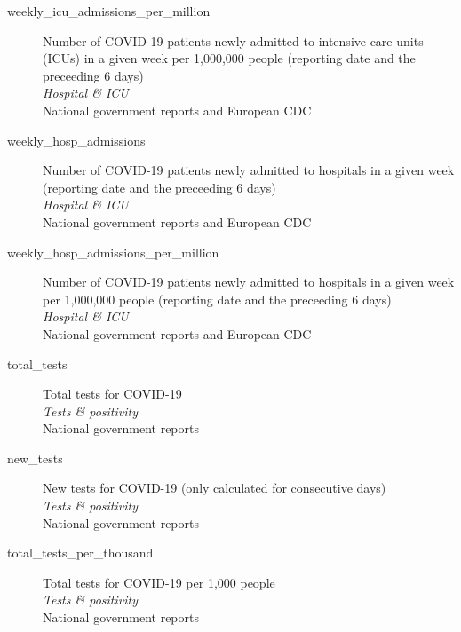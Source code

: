 \begin{description}
    \item[weekly\_icu\_admissions\_per\_million] 
    Number of COVID-19 patients newly admitted to intensive care units (ICUs) in a given week per 1,000,000 people (reporting date and the preceeding 6 days)\\
    \emph{\footnotesize{Hospital \& ICU}}\\
    \footnotesize{National government reports and European CDC}\\

    \item[weekly\_hosp\_admissions] 
    Number of COVID-19 patients newly admitted to hospitals in a given week (reporting date and the preceeding 6 days)\\
    \emph{\footnotesize{Hospital \& ICU}}\\
    \footnotesize{National government reports and European CDC}\\

    \item[weekly\_hosp\_admissions\_per\_million] 
    Number of COVID-19 patients newly admitted to hospitals in a given week per 1,000,000 people (reporting date and the preceeding 6 days)\\
    \emph{\footnotesize{Hospital \& ICU}}\\
    \footnotesize{National government reports and European CDC}\\

    \item[total\_tests] 
    Total tests for COVID-19\\
    \emph{\footnotesize{Tests \& positivity}}\\
    \footnotesize{National government reports}\\

    \item[new\_tests] 
    New tests for COVID-19 (only calculated for consecutive days)\\
    \emph{\footnotesize{Tests \& positivity}}\\
    \footnotesize{National government reports}\\

    \item[total\_tests\_per\_thousand] 
    Total tests for COVID-19 per 1,000 people\\
    \emph{\footnotesize{Tests \& positivity}}\\
    \footnotesize{National government reports}\\


\end{description}
